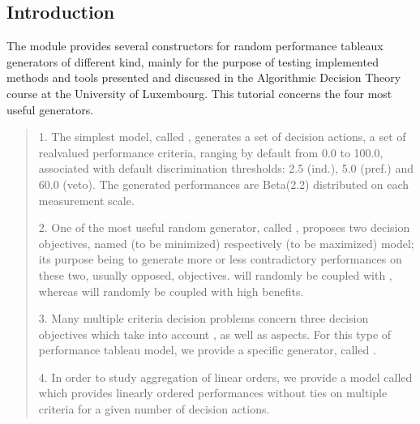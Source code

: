 \documentclass[a4paper,12pt,english]{sphinxhowto}
\begin{document}
\subsection{Introduction}
\label{\detokenize{tutorial:introduction}}
The  module provides several constructors for random performance tableaux generators of different kind, mainly for the purpose of testing implemented methods and tools presented and discussed in the Algorithmic Decision Theory course at the University of Luxembourg. This tutorial concerns the four most useful generators.
\begin{quote}

1. The simplest model, called , generates
a set of  decision actions, a set of  real\sphinxhyphen{}valued
performance criteria, ranging by default from 0.0 to 100.0,
associated with default discrimination thresholds: 2.5 (ind.),
5.0 (pref.) and 60.0 (veto). The generated performances are
Beta(2.2) distributed on each measurement scale.

2. One of the most useful random generator, called
, proposes two decision objectives,
named  (to be minimized) respectively  (to be
maximized) model; its purpose being to generate more or less
contradictory performances on these two, usually opposed,
objectives.  will randomly be coupled with , whereas  will randomly be coupled
with high benefits.

3. Many multiple criteria decision problems concern three decision
objectives which take into account ,  as well
as  aspects. For this type of performance tableau model,
we provide a specific generator,
called .

4. In order to study aggregation of linear orders, we provide a model
called  which provides linearly
ordered performances without ties on multiple criteria for
a given number of decision actions.
\end{quote}
\end{document}
